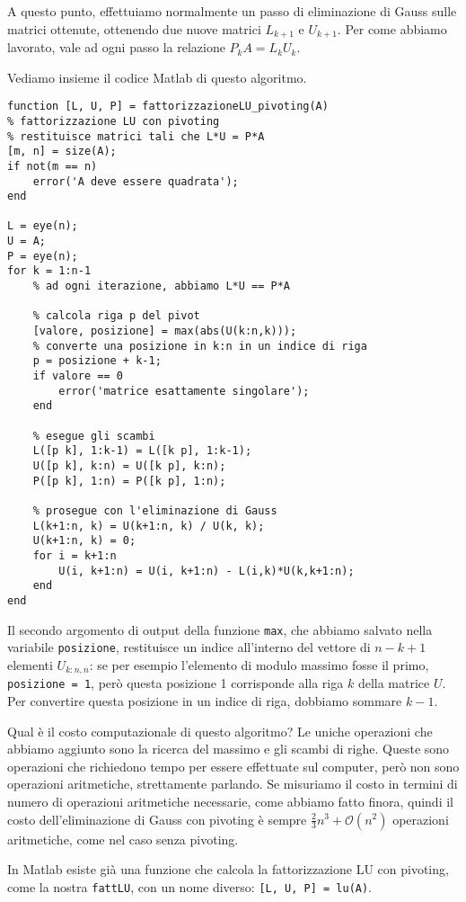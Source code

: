 \documentclass[a4paper]{report}
\theoremstyle{definiton}
\theoremstyle{remark}
\begin{document}
A questo punto, effettuiamo normalmente un passo di eliminazione di Gauss sulle matrici ottenute, ottenendo due nuove matrici $L_{k+1}$ e $U_{k+1}$. Per come abbiamo lavorato, vale ad ogni passo la relazione $P_k A = L_k U_k$.

Vediamo insieme il codice Matlab di questo algoritmo.
\begin{lstlisting}
function [L, U, P] = fattorizzazioneLU_pivoting(A)
% fattorizzazione LU con pivoting
% restituisce matrici tali che L*U = P*A
[m, n] = size(A);
if not(m == n)
    error('A deve essere quadrata');
end

L = eye(n);
U = A;
P = eye(n);
for k = 1:n-1
    % ad ogni iterazione, abbiamo L*U == P*A

    % calcola riga p del pivot
    [valore, posizione] = max(abs(U(k:n,k)));
    % converte una posizione in k:n in un indice di riga
    p = posizione + k-1;
    if valore == 0
        error('matrice esattamente singolare');
    end

    % esegue gli scambi
    L([p k], 1:k-1) = L([k p], 1:k-1);
    U([p k], k:n) = U([k p], k:n);
    P([p k], 1:n) = P([k p], 1:n);

    % prosegue con l'eliminazione di Gauss
    L(k+1:n, k) = U(k+1:n, k) / U(k, k);
    U(k+1:n, k) = 0;
    for i = k+1:n
        U(i, k+1:n) = U(i, k+1:n) - L(i,k)*U(k,k+1:n);
    end
end    
\end{lstlisting}
Il secondo argomento di output della funzione \lstinline{max}, che abbiamo salvato nella variabile \lstinline{posizione}, restituisce un indice all'interno del vettore di $n-k+1$ elementi $U_{k:n,n}$: se per esempio l'elemento di modulo massimo fosse il primo, \lstinline{posizione = 1}, però questa posizione 1 corrisponde alla riga $k$ della matrice $U$. Per convertire questa posizione in un indice di riga, dobbiamo sommare $k-1$.

Qual è il costo computazionale di questo algoritmo? Le uniche operazioni che abbiamo aggiunto sono la ricerca del massimo e gli scambi di righe. Queste sono operazioni che richiedono tempo per essere effettuate sul computer, però non sono operazioni aritmetiche, strettamente parlando. Se misuriamo il costo in termini di numero di operazioni aritmetiche necessarie, come abbiamo fatto finora, quindi il costo dell'eliminazione di Gauss con pivoting è sempre  $\frac23 n^3 + \mathcal{O}(n^2)$ operazioni aritmetiche, come nel caso senza pivoting.

In Matlab esiste già una funzione che calcola la fattorizzazione LU con pivoting, come la nostra \lstinline{fattLU}, con un nome diverso: \lstinline{[L, U, P] = lu(A)}.
\end{document}
